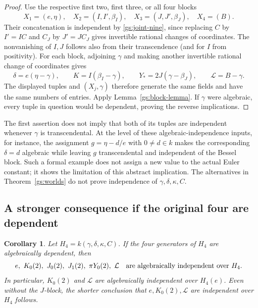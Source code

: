 \documentclass[11pt]{article}
\newtheorem{corollary}[theorem]{Corollary}
\theoremstyle{definition}
\theoremstyle{remark}
\begin{document}
\begin{proof}
Use the respective first two, first three, or all four blocks
\[
 X_1=(e,\eta),\quad X_2=(I,I',\beta_I),\quad
 X_3=(J,J',\beta_J),\quad X_4=(B).
\]
Their concatenation is independent by \eqref{gs:joint-nine}, since
replacing $C$ by $I'=IC$ and $C_J$ by $J'=JC_J$ gives invertible
rational changes of coordinates. The nonvanishing of $I,J$ follows
also from their transcendence (and for $I$ from positivity).
For each block, adjoining $\gamma$ and making another invertible
rational change of coordinates gives
\[
 \delta=e(\eta-\gamma),\qquad
 K=I(\beta_I-\gamma),\qquad
 Y_*=2J(\gamma-\beta_J),\qquad
 \mathcal L=B-\gamma.
\]
The displayed tuples and $(X_j,\gamma)$ therefore generate the same
fields and have the same numbers of entries. Apply
Lemma~\ref{gs:block-lemma}. If $\gamma$ were algebraic, every tuple
in question would be dependent, proving the reverse implications.
\end{proof}

The first assertion does not imply that both of its tuples are
independent whenever $\gamma$ is transcendental. At the level of
these algebraic-independence inputs, for instance, the assignment
$g=\eta-d/e$ with $0\ne d\in k$ makes the corresponding
$\delta=d$ algebraic while leaving $g$ transcendental and independent
of the Bessel block. Such a formal example does not assign a new
value to the actual Euler constant; it shows the limitation of this
abstract implication. The alternatives in
Theorem~\ref{gs:worlds} do not prove independence of
$\gamma,\delta,\kappa,C$.

\subsection{A stronger consequence if the original four are dependent}

\begin{corollary}\label{gs:conditional-six}
Let $H_4=k(\gamma,\delta,\kappa,C)$. If the four generators of
$H_4$ are algebraically dependent, then
\begin{equation}\label{gs:six-over-H4}
 e,\ K_0(2),\ J_0(2),\ J_1(2),\ \pi Y_0(2),\ \mathcal L
 \quad\hbox{are algebraically independent over }H_4.
\end{equation}
In particular, $K_0(2)$ and $\mathcal L$ are algebraically independent
over $H_4(e)$. Even without the $J$-block, the shorter conclusion
that $e,K_0(2),\mathcal L$ are independent over $H_4$ follows.
\end{corollary}
\end{document}
